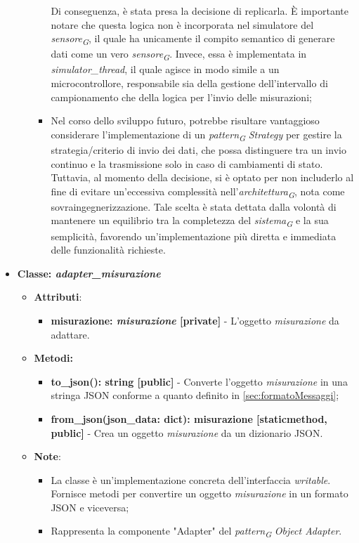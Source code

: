 \begin{itemize}
\begin{itemize}
\begin{itemize}
            Di conseguenza, è stata presa la decisione di replicarla. È importante notare che questa logica non è incorporata nel simulatore del \textit{sensore}\textsubscript{\textit{G}}, il quale ha unicamente il compito semantico di generare dati come un vero \textit{sensore}\textsubscript{\textit{G}}. Invece, essa è implementata in \textit{simulator\_thread}, il quale agisce in modo simile a un microcontrollore, responsabile sia della gestione dell'intervallo di campionamento che della logica per l'invio delle misurazioni;
            \item Nel corso dello sviluppo futuro, potrebbe risultare vantaggioso considerare l'implementazione di un \textit{pattern}\textsubscript{\textit{G}} \textit{Strategy} per gestire la strategia/criterio di invio dei dati, che possa distinguere tra un invio continuo e la trasmissione solo in caso di cambiamenti di stato. Tuttavia, al momento della decisione, si è optato per non includerlo al fine di evitare un'eccessiva complessità nell'\textit{architettura}\textsubscript{\textit{G}}, nota come sovraingegnerizzazione. Tale scelta è stata dettata dalla volontà di mantenere un equilibrio tra la completezza del \textit{sistema}\textsubscript{\textit{G}} e la sua semplicità, favorendo un'implementazione più diretta e immediata delle funzionalità richieste.
        \end{itemize}
    \end{itemize}

    \item{\textbf{Classe: \textit{adapter\_misurazione}}}
    \begin{itemize}
        \item\textbf{Attributi}:
        \begin{itemize}
            \item \textbf{misurazione: \textit{misurazione} [private]} - L'oggetto \textit{misurazione} da adattare.
        \end{itemize}
        \item \textbf{Metodi: }
        \begin{itemize}
            \item \textbf{to\_json(): string [public]} - Converte l'oggetto \textit{misurazione} in una stringa JSON conforme a quanto definito in \ref{sec:formatoMessaggi};
            \item \textbf{from\_json(json\_data: dict): misurazione [staticmethod, public]} - Crea un oggetto \textit{misurazione} da un dizionario JSON.
        \end{itemize}
        \item\textbf{Note}:
        \begin{itemize}
            \item La classe è un'implementazione concreta dell'interfaccia \textit{writable}. Fornisce metodi per convertire un oggetto \textit{misurazione} in un formato JSON e viceversa;
            \item Rappresenta la componente "Adapter" del \textit{pattern}\textsubscript{\textit{G}} \textit{Object Adapter}.
        \end{itemize}
    \end{itemize}


\end{itemize}
